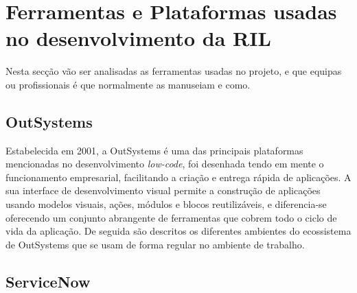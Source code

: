 \section{Ferramentas e Plataformas usadas no desenvolvimento da RIL}

    Nesta secção vão ser analisadas as ferramentas usadas no projeto, e que equipas ou profissionais é que normalmente as manuseiam e como.

    \subsection{OutSystems}\label{sec:outsystems}
    
        Estabelecida em 2001, a OutSystems é uma das principais plataformas mencionadas no desenvolvimento \textit{low-code}, foi desenhada tendo em mente o funcionamento empresarial, facilitando a criação e entrega rápida de aplicações. A sua interface de desenvolvimento visual permite a construção de aplicações usando modelos visuais, ações, módulos e blocos reutilizáveis, e diferencia-se oferecendo um conjunto abrangente de ferramentas que cobrem todo o ciclo de vida da aplicação\cite{os-vision}. De seguida são descritos os diferentes ambientes do ecossistema de OutSystems que se usam de forma regular no ambiente de trabalho.
                    
        

        

        

    \subsection{ServiceNow}\label{sec:service-now}

